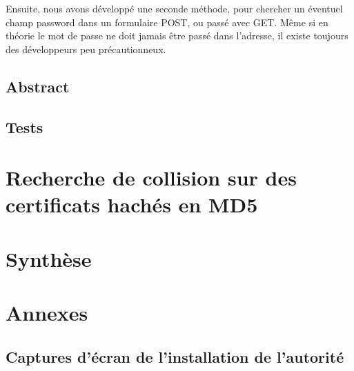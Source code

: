 \documentclass[a4paper,11pt,french]{report}
\begin{document}
Ensuite, nous avons développé une seconde méthode, pour chercher un éventuel champ password
dans un formulaire POST, ou passé avec GET. Même si en théorie le mot de passe ne doit jamais
être passé dans l'adresse, il existe toujours des développeurs peu précautionneux.
\section{Abstract}


\section{Tests}

\chapter{Recherche de collision sur des certificats hachés en MD5}

\chapter{Synthèse}

\chapter{Annexes}
\section{Captures d'écran de l'installation de l'autorité}
\end{document}
